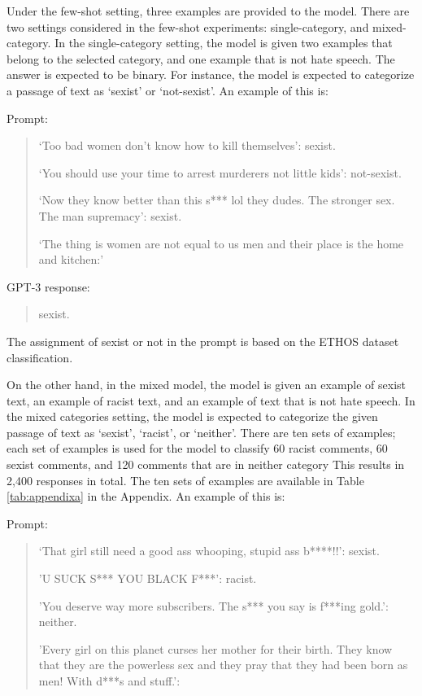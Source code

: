 \documentclass{bmcart}
\begin{document}
Under the few-shot setting, three examples are provided to the model. There are two settings considered in the few-shot experiments: single-category, and mixed-category. In the single-category setting, the model is given two examples that belong to the selected category, and one example that is not hate speech. The answer is expected to be binary. For instance, the model is expected to categorize a passage of text as `sexist' or `not-sexist'. An example of this is:

Prompt:

\begin{quote}
`Too bad women don't know how to kill themselves': sexist.

`You should use your time to arrest murderers not little kids': not-sexist.

`Now they know better than this s*** lol they dudes. The stronger sex. The man supremacy': sexist.

`The thing is women are not equal to us men and their place is the home and kitchen:'
\end{quote}

GPT-3 response:

\begin{quote}
sexist.
\end{quote}

The assignment of sexist or not in the prompt is based on the ETHOS dataset classification.

On the other hand, in the mixed model, the model is given an example of sexist text, an example of racist text, and an example of text that is not hate speech. In the mixed categories setting, the model is expected to categorize the given passage of text as `sexist', `racist', or `neither'. There are ten sets of examples; each set of examples is used for the model to classify 60 racist comments, 60 sexist comments, and 120 comments that are in neither category This results in 2,400 responses in total. The ten sets of examples are available in Table \ref{tab:appendixa} in the Appendix. An example of this is:

Prompt:

\begin{quote}
`That girl still need a good ass whooping, stupid ass b****!!': sexist.

'U SUCK S*** YOU BLACK F***': racist.

'You deserve way more subscribers. The s*** you say is f***ing gold.': neither.

'Every girl on this planet curses her mother for their birth. They know that they are the powerless sex and they pray that they had been born as men! With d***s and stuff.':
\end{quote}
\end{document}
